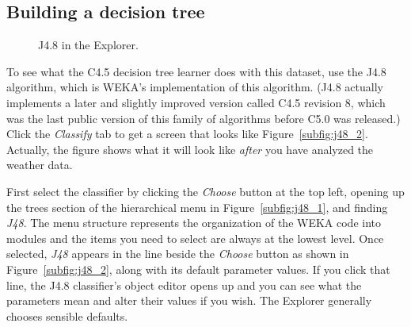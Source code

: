\subsection{Building a decision tree}
\label{subsection:building_decision_tree}

\begin{figure}[!th]
\centering
{}
\qquad
{}
\caption{\label{fig:j48_explorer}J4.8 in the Explorer.}
\end{figure}

To see what the C4.5 decision tree learner does with this dataset, use
the J4.8 algorithm, which is WEKA's implementation of this
algorithm. (J4.8 actually implements a later and slightly improved
version called C4.5 revision 8, which was the last public version of
this family of algorithms before C5.0 was released.) Click the
\textit{Classify} tab to get a screen that looks like
Figure~\ref{subfig:j48_2}. Actually, the figure shows what it will
look like \textit{after} you have analyzed the weather data.

First select the classifier by clicking the \textit{Choose} button at
the top left, opening up the trees section of the hierarchical menu in
Figure~\ref{subfig:j48_1}, and finding \textit{J48}. The menu
structure represents the organization of the WEKA code into modules
and the items you need to select are always at the lowest level. Once
selected, \textit{J48} appears in the line beside the \textit{Choose}
button as shown in Figure~\ref{subfig:j48_2}, along with its default parameter
values. If you click that line, the J4.8 classifier's object editor
opens up and you can see what the parameters mean and alter their
values if you wish. The Explorer generally chooses sensible defaults.


